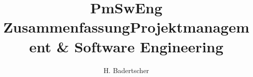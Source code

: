 \documentclass{scrartcl}
\title{PmSwEng Zusammenfassung}
\author{H. Badertscher}
\begin{document}
\title{\Huge{Projektmanagement \& Software Engineering}}
\maketitle

\setcounter{tocdepth}{1}
\tableofcontents

\newpage


\newpage

\newpage




\newpage

\end{document}
